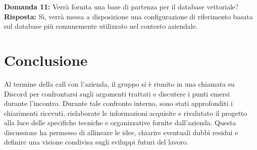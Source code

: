 \documentclass[a4paper,12pt]{article}
\begin{document}
\vspace{2em}

\textbf{Domanda 11:} Verrà fornita una base di partenza per il database vettoriale?\\[0.5em]
\textbf{Risposta:} Sì, verrà messa a disposizione una configurazione di riferimento basata sul database più comunemente utilizzato nel contesto aziendale.

\section{Conclusione}
Al termine della call con l’azienda, il gruppo si è riunito in una chiamata su Discord per confrontarsi sugli argomenti trattati e discutere i punti emersi durante l’incontro.  
Durante tale confronto interno, sono stati approfonditi i chiarimenti ricevuti, rielaborate le informazioni acquisite e rivalutato il progetto alla luce delle specifiche tecniche e organizzative fornite dall’azienda.  
Questa discussione ha permesso di allineare le idee, chiarire eventuali dubbi residui e definire una visione condivisa sugli sviluppi futuri del lavoro.
\end{document}
